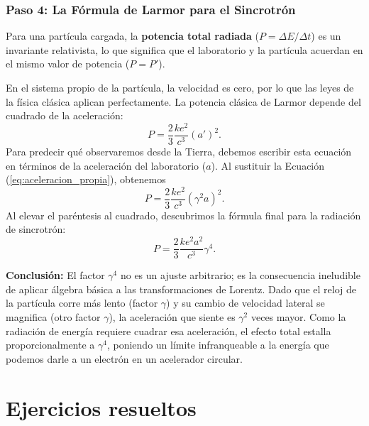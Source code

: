 \documentclass[11pt,a4paper]{book}
\begin{document}
\subsubsection{Paso 4: La Fórmula de Larmor para el Sincrotrón}

Para una partícula cargada, la \textbf{potencia total radiada} ($P = \Delta E / \Delta t$) es un invariante relativista, lo que significa que el laboratorio y la partícula acuerdan en el mismo valor de potencia ($P = P'$). 

En el sistema propio de la partícula, la velocidad es cero, por lo que las leyes de la física clásica aplican perfectamente. La potencia clásica de Larmor depende del cuadrado de la aceleración:
\begin{equation}
    P = \frac{2}{3} \frac{k e^2}{c^3} (a')^2.
\end{equation}
Para predecir qué observaremos desde la Tierra, debemos escribir esta ecuación en términos de la aceleración del laboratorio ($a$). Al sustituir la Ecuación (\ref{eq:aceleracion_propia}), obtenemos
\begin{equation}
    P = \frac{2}{3} \frac{k e^2}{c^3} (\gamma^2 a)^2.
\end{equation}
Al elevar el paréntesis al cuadrado, descubrimos la fórmula final para la radiación de sincrotrón:
\begin{equation}
    P = \frac{2}{3} \frac{k e^2 a^2}{c^3} \gamma^4.
\end{equation}

\textbf{Conclusión:} 
El factor $\gamma^4$ no es un ajuste arbitrario; es la consecuencia ineludible de aplicar álgebra básica a las transformaciones de Lorentz. Dado que el reloj de la partícula corre más lento (factor $\gamma$) y su cambio de velocidad lateral se magnifica (otro factor $\gamma$), la aceleración que siente es $\gamma^2$ veces mayor. Como la radiación de energía requiere cuadrar esa aceleración, el efecto total estalla proporcionalmente a $\gamma^4$, poniendo un límite infranqueable a la energía que podemos darle a un electrón en un acelerador circular.

\section{Ejercicios resueltos}
\end{document}
